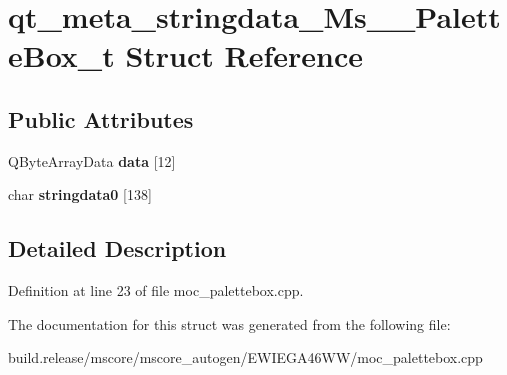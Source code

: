 \hypertarget{structqt__meta__stringdata___ms_____palette_box__t}{}\section{qt\+\_\+meta\+\_\+stringdata\+\_\+\+Ms\+\_\+\+\_\+\+Palette\+Box\+\_\+t Struct Reference}
\label{structqt__meta__stringdata___ms_____palette_box__t}
\subsection*{Public Attributes}
\begin{DoxyCompactItemize}
\item 
\mbox{\label{structqt__meta__stringdata___ms_____palette_box__t_afe4d42d88e03655b381a76d99b18cf4a}} 
Q\+Byte\+Array\+Data {\bfseries data} \mbox{[}12\mbox{]}
\item 
\mbox{\label{structqt__meta__stringdata___ms_____palette_box__t_a6cacb054adcd460ad0f4484e70ab099d}} 
char {\bfseries stringdata0} \mbox{[}138\mbox{]}
\end{DoxyCompactItemize}


\subsection{Detailed Description}


Definition at line 23 of file moc\+\_\+palettebox.\+cpp.



The documentation for this struct was generated from the following file\+:\begin{DoxyCompactItemize}
\item 
build.\+release/mscore/mscore\+\_\+autogen/\+E\+W\+I\+E\+G\+A46\+W\+W/moc\+\_\+palettebox.\+cpp\end{DoxyCompactItemize}
